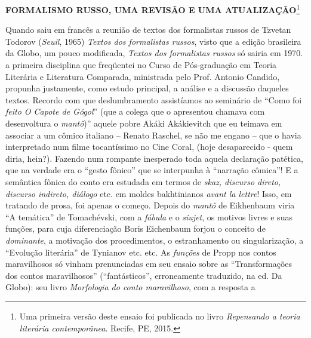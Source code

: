 \textbf{FORMALISMO RUSSO, UMA REVISÃO E UMA ATUALIZAÇÃO}\footnote{Uma
  primeira versão deste ensaio foi publicada no livro \emph{Repensando a
  teoria literária contemporânea}. Recife, PE, 2015.}

Quando saiu em francês a reunião de textos dos formalistas russos de
Tzvetan Todorov (\emph{Seuil}, 1965) \emph{Textos dos formalistas
russos}, visto que a edição brasileira da Globo, um pouco modificada,
\emph{Textos dos formalistas russos} só sairia em 1970. a primeira
disciplina que freqüentei no Curso de Pós-graduação em Teoria Literária
e Literatura Comparada, ministrada pelo Prof. Antonio Candido, propunha
justamente, como estudo principal, a análise e a discussão daqueles
textos. Recordo com que deslumbramento assistíamos ao seminário de
``Como foi \emph{feito O Capote de Gógol}'' (que a colega que o
apresentou chamava com desenvoltura o \emph{mantô})'' aquele pobre Akáki
Akákievitch que eu teimava em associar a um cômico italiano -- Renato
Raschel, se não me engano -- que o havia interpretado num filme
tocantíssimo no Cine Coral, (hoje desaparecido - quem diria, hein?).
Fazendo num rompante inesperado toda aquela declaração patética, que na
verdade era o ``gesto fônico'' que se interpunha à ``narração cômica''!
E a semântica fônica do conto era estudada em termos de \emph{skaz,
discurso direto, discurso indireto, diálogo} etc. em moldes bakhtinianos
\emph{avant la lettre}! Isso, em tratando de prosa, foi apenas o começo.
Depois do \emph{mantô} de Eikhenbaum viria ``A temática'' de
Tomachévski, com a \emph{fábula} e o \emph{siujet}, os motivos livres e
suas funções, para cuja diferenciação Boris Eichenbaum forjou o conceito
de \emph{dominante}, a motivação dos procedimentos, o estranhamento ou
singularização, a ``Evolução literária'' de Tynianov etc. etc. As
\emph{funções} de Propp nos contos maravilhosos só vinham prenunciadas
em seu ensaio sobre as ``Transformações dos contos maravilhosos''
(``fantásticos'', erroneamente traduzido, na ed. Da Globo): seu livro
\emph{Morfologia do conto maravilhoso}, com a resposta a
